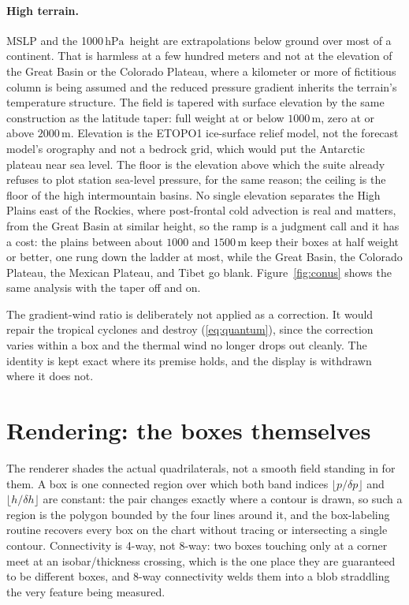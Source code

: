\documentclass[11pt]{article}
\newcommand{\hPa}{\ensuremath{\,\mathrm{hPa}}}
\begin{document}
\paragraph{High terrain.} MSLP and the 1000\hPa\ height are extrapolations below ground over most of a continent. That is harmless at a few hundred meters and not at the elevation of the Great Basin or the Colorado Plateau, where a kilometer or more of fictitious column is being assumed and the reduced pressure gradient inherits the terrain's temperature structure. The field is tapered with surface elevation by the same construction as the latitude taper: full weight at or below $1000$\,m, zero at or above $2000$\,m. Elevation is the ETOPO1 ice-surface relief model, not the forecast model's orography and not a bedrock grid, which would put the Antarctic plateau near sea level. The floor is the elevation above which the suite already refuses to plot station sea-level pressure, for the same reason; the ceiling is the floor of the high intermountain basins. No single elevation separates the High Plains east of the Rockies, where post-frontal cold advection is real and matters, from the Great Basin at similar height, so the ramp is a judgment call and it has a cost: the plains between about $1000$ and $1500$\,m keep their boxes at half weight or better, one rung down the ladder at most, while the Great Basin, the Colorado Plateau, the Mexican Plateau, and Tibet go blank. Figure~\ref{fig:conus} shows the same analysis with the taper off and on.

The gradient-wind ratio is deliberately not applied as a correction. It would repair the tropical cyclones and destroy (\ref{eq:quantum}), since the correction varies within a box and the thermal wind no longer drops out cleanly. The identity is kept exact where its premise holds, and the display is withdrawn where it does not.

\section{Rendering: the boxes themselves}
\label{sec:render}

The renderer shades the actual quadrilaterals, not a smooth field standing in for them. A box is one connected region over which both band indices $\lfloor p/\delta p\rfloor$ and $\lfloor h/\delta h\rfloor$ are constant: the pair changes exactly where a contour is drawn, so such a region is the polygon bounded by the four lines around it, and the box-labeling routine recovers every box on the chart without tracing or intersecting a single contour. Connectivity is 4-way, not 8-way: two boxes touching only at a corner meet at an isobar/thickness crossing, which is the one place they are guaranteed to be different boxes, and 8-way connectivity welds them into a blob straddling the very feature being measured.
\end{document}
